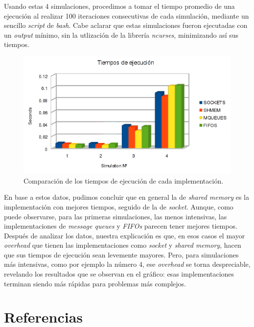 \documentclass[a4paper,10pt]{article}
\begin{document}
Usando estas 4 simulaciones, procedimos a tomar el tiempo promedio de una ejecución al realizar 100 iteraciones consecutivas de cada simulación, mediante un
sencillo \textit{script} de \textit{bash}.
Cabe aclarar que estas simulaciones fueron ejecutadas con un \textit{output} mínimo, sin la utlización de la librería \textit{ncurses}, minimizando así sus tiempos.

\begin{figure}[H]
\begin{center}
 \includegraphics[scale=0.75]{./images/runningTimesChart.png}
  \caption{Comparación de los tiempos de ejecución de cada implementación.}
\end{center}
\end{figure}

En base a estos datos, pudimos concluir que en general la de \textit{shared memory} es la implementación con mejores tiempos, seguido de la de \textit{socket}. 
Aunque, como puede observarse, para las primeras simulaciones, las menos intensivas, las implementaciones de \textit{message queues} y \textit{FIFOs} parecen 
tener mejores tiempos. Después de analizar los datos, nuestra explicación es que, en esos casos el mayor \textit{overhead} que tienen las implementaciones como 
\textit{socket} y \textit{shared memory}, hacen que sus tiempos de ejecución sean levemente mayores. 
Pero, para simulaciones más intensivas, como por ejemplo la número 4, ese \textit{overhead} se torna despreciable, revelando los resultados que se observan en 
el gráfico: esas implementaciones terminan siendo más rápidas para problemas más complejos.\\

\newpage     
\section{Referencias}
\end{document}
